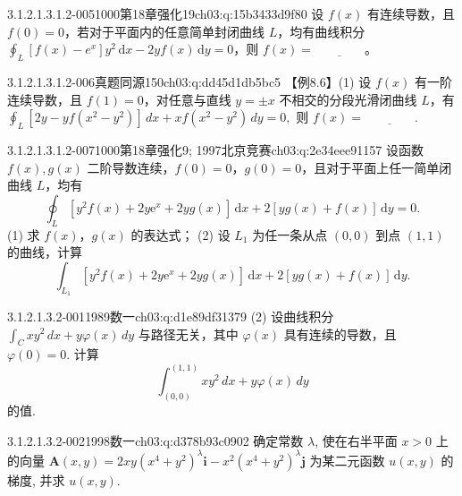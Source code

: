 \begin{q}{3.1.2.1.3.1.2-005}{1000第18章强化19}{ch03:q:15b3433d9f80}
设 $f(x)$ 有连续导数，且 $f(0)=0$，若对于平面内的任意简单封闭曲线 $L$，均有曲线积分 $\displaystyle \oint_L [f(x)-e^x]y^2\,\mathrm{d}x - 2yf(x)\,\mathrm{d}y = 0$，则 $f(x)=\underline{\hspace{4em}}$。
\end{q}

\begin{q}{3.1.2.1.3.1.2-006}{真题同源150}{ch03:q:dd45d1db5bc5}
【例8.6】(1) 设 $f(x)$ 有一阶连续导数，且 $f(1)=0$，对任意与直线 $y=\pm x$ 不相交的分段光滑闭曲线 $L$，有
$\displaystyle \oint_L [2y-yf(x^2-y^2)]\,dx+xf(x^2-y^2)\,dy=0,$
则 $f(x)=\underline{\hspace{4em}}$.
\end{q}

\begin{q}{3.1.2.1.3.1.2-007}{1000第18章强化9; 1997北京竞赛}{ch03:q:2e34eee91157}
设函数 $f(x),g(x)$ 二阶导数连续，$f(0)=0$，$g(0)=0$，且对于平面上任一简单闭曲线 $L$，均有
\[
\oint_L [y^2 f(x)+2y\mathrm{e}^x+2y g(x)]\,\mathrm{d}x+2[y g(x)+f(x)]\,\mathrm{d}y=0.
\]
(1) 求 $f(x)$，$g(x)$ 的表达式；
(2) 设 $L_1$ 为任一条从点 $(0,0)$ 到点 $(1,1)$ 的曲线，计算
\[
\int_{L_1} [y^2 f(x)+2y\mathrm{e}^x+2y g(x)]\,\mathrm{d}x+2[y g(x)+f(x)]\,\mathrm{d}y.
\]
\end{q}

\par\addvspace{2.4ex}\noindent
\begin{minipage}{\linewidth}

\begin{q}{3.1.2.1.3.2-001}{1989数一}{ch03:q:d1e89df31379}
(2) 设曲线积分 $\displaystyle \int_C xy^2\,dx + y\varphi(x)\,dy$ 与路径无关，其中 $\varphi(x)$ 具有连续的导数，且 $\varphi(0)=0$. 计算
\[
\int_{(0,0)}^{(1,1)} xy^2\,dx + y\varphi(x)\,dy
\]
的值.
\end{q}
\end{minipage}


\begin{q}{3.1.2.1.3.2-002}{1998数一}{ch03:q:d378b93c0902}
确定常数 $\lambda$, 使在右半平面 $x>0$ 上的向量 $\mathbf{A}(x,y)=2xy(x^4+y^2)^\lambda \mathbf{i}-x^2(x^4+y^2)^\lambda \mathbf{j}$ 为某二元函数 $u(x,y)$ 的梯度, 并求 $u(x,y)$.
\end{q}

